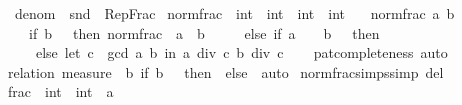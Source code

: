 \begin{isabellebody}
\ \ {\isachardoublequoteopen}denom\ {\isasymequiv}\ snd\ {\isasymcirc}\ Rep{\isacharunderscore}{\kern0pt}Frac{\isachardoublequoteclose}\isanewline
\isanewline
{}\isamarkupfalse%
\ norm{\isacharunderscore}{\kern0pt}frac\ {\isacharcolon}{\kern0pt}{\isacharcolon}{\kern0pt}\ {\isachardoublequoteopen}int\ {\isasymRightarrow}\ int\ {\isasymRightarrow}\ int\ {\isasymtimes}\ int{\isachardoublequoteclose}\ \isanewline
\ \ {\isachardoublequoteopen}norm{\isacharunderscore}{\kern0pt}frac\ a\ b\ {\isacharequal}{\kern0pt}\isanewline
\ \ \ \ {\isacharparenleft}{\kern0pt}if\ b\ {\isacharless}{\kern0pt}\ {}\ then\ norm{\isacharunderscore}{\kern0pt}frac\ {\isacharparenleft}{\kern0pt}{\isacharminus}{\kern0pt}\ a{\isacharparenright}{\kern0pt}\ {\isacharparenleft}{\kern0pt}{\isacharminus}{\kern0pt}\ b{\isacharparenright}{\kern0pt}\isanewline
\ \ \ \ \ else\ if\ a\ {\isacharequal}{\kern0pt}\ {}\ {\isasymor}\ b\ {\isacharequal}{\kern0pt}\ {}\ then\ {\isacharparenleft}{\kern0pt}{}{\isacharcomma}{\kern0pt}\ {}{\isacharparenright}{\kern0pt}\isanewline
\ \ \ \ \ else\ let\ c\ {\isacharequal}{\kern0pt}\ gcd\ a\ b\ in\ {\isacharparenleft}{\kern0pt}a\ div\ c{\isacharcomma}{\kern0pt}\ b\ div\ c{\isacharparenright}{\kern0pt}{\isacharparenright}{\kern0pt}{\isachardoublequoteclose}\isanewline
%
\isadelimproof
\ \ %
\endisadelimproof
%
\isatagproof
{}\isamarkupfalse%
\ pat{\isacharunderscore}{\kern0pt}completeness\ auto%
\endisatagproof
{\isafoldproof}%
%
\isadelimproof
\isanewline
%
\endisadelimproof
\ \ \isamarkupfalse%
%
\isadelimproof
\ %
\endisadelimproof
%
\isatagproof
{}\isamarkupfalse%
\ {\isacharparenleft}{\kern0pt}relation\ {\isachardoublequoteopen}measure\ {\isacharparenleft}{\kern0pt}{\isasymlambda}{\isacharparenleft}{\kern0pt}{\isacharunderscore}{\kern0pt}{\isacharcomma}{\kern0pt}\ b{\isacharparenright}{\kern0pt}{\isachardot}{\kern0pt}\ if\ b\ {\isacharless}{\kern0pt}\ {}\ then\ {}\ else\ {}{\isacharparenright}{\kern0pt}{\isachardoublequoteclose}{\isacharparenright}{\kern0pt}\ auto%
\endisatagproof
{\isafoldproof}%
%
\isadelimproof
%
\endisadelimproof
\isanewline
\isanewline
{}\isamarkupfalse%
\ norm{\isacharunderscore}{\kern0pt}frac{\isachardot}{\kern0pt}simps{\isacharbrackleft}{\kern0pt}simp\ del{\isacharbrackright}{\kern0pt}\isanewline
\isanewline
{}\isamarkupfalse%
\ frac\ {\isacharcolon}{\kern0pt}{\isacharcolon}{\kern0pt}\ {\isachardoublequoteopen}int\ {\isasymRightarrow}\ int\ {\isasymRightarrow}\ {\isacharprime}{\kern0pt}a{\isachardoublequoteclose}\ \isanewline

\end{isabellebody}
